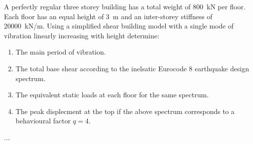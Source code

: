 
\begin{Exercise}[label=three_storey_regular]
A perfectly regular three storey building has a total weight of \SI{800}{kN} per floor. Each floor has an equal height of \SI{3}{m} and an inter-storey stiffness of \SI{20000}{kN/m}. Using a simplified shear building model with a single mode of vibration linearly increasing with height determine:
\begin{enumerate}
    \item The main period of vibration.
    \item The total base shear according to the inelsatic Eurocode 8 earthquake design spectrum.
    \item The equivalent static loads at each floor for the same spectrum.
    \item The peak displecment at the top if the above spectrum corresponds to a behavioural factor $q=4$.
\end{enumerate}

\begin{center}
\end{center}

\shortAnswer ...
\end{Exercise}


\begin{Answer}[ref=three_storey_regular]

\end{Answer}